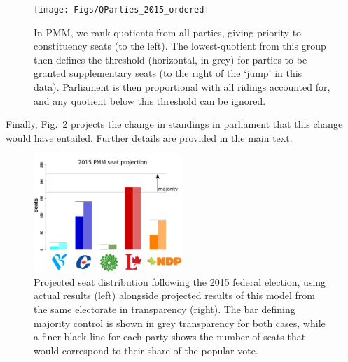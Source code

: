 \documentclass[DIV=calc, paper=a4, fontsize=11pt, twocolumn]{scrartcl}	 %
\begin{document}
\begin{figure}[h!]
\texttt{[image: Figs/QParties\_2015\_ordered]}
\caption{ In PMM, we rank quotients from all parties, giving priority to constituency seats (to the left). The lowest-quotient from this group then defines the threshold (horizontal, in grey) for parties to be granted supplementary seats (to the right of the `jump' in this data). Parliament is then proportional with all ridings accounted for, and any quotient below this threshold can be ignored.}
\label{fig:sumQParties-2015-ordered}
\end{figure}

Finally, Fig.~\ref{fig:hypo_2015_sum} projects the change in standings in parliament that this change would have entailed. Further details are provided in the main text.

\begin{figure}[h!]
  \includegraphics[width=0.50\textwidth,clip]{Figs/2015_seat_projection}
  \caption{Projected seat distribution following the 2015 federal election, using actual results (left) alongside projected results of this model from the same electorate in transparency (right). The bar defining majority control is shown in grey transparency for both cases, while a finer black line for each party shows the number of seats that would correspond to their share of the popular vote.}
\label{fig:hypo_2015_sum}
\end{figure}

\pagebreak

\maketitle %
\thispagestyle{fancy} %

\end{document}
